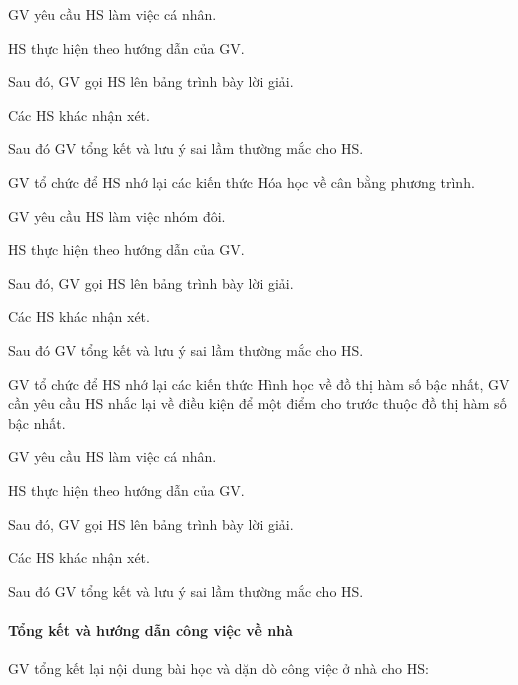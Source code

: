 \tochucthuchien

\begin{tcth}[vidu=1]
	\buocmot
	\item GV yêu cầu HS làm việc cá nhân.
	\buochai
	\item HS thực hiện theo hướng dẫn của GV.
	\buocba
	\item Sau đó, GV gọi HS	lên bảng trình bày lời giải.
	\item Các HS khác nhận xét.
	\buocbon
	\item Sau đó GV tổng kết và lưu ý sai lầm thường mắc cho HS.
\end{tcth}

\begin{tcth}[vidu=2]
	\buocmot
	\item GV tổ chức để HS nhớ lại các kiến thức Hóa học về cân bằng phương trình.
	\item GV yêu cầu HS làm việc nhóm đôi.
	\buochai
	\item HS thực hiện theo hướng dẫn của GV.
	\buocba
	\item Sau đó, GV gọi HS	lên bảng trình bày lời giải.
	\item Các HS khác nhận xét.
	\buocbon
	\item Sau đó GV tổng kết và lưu ý sai lầm thường mắc cho HS.
\end{tcth}

\begin{tcth}[vidu=3]
	\buocmot
	\item GV tổ chức để HS nhớ lại các kiến thức Hình học về đồ thị hàm số bậc nhất, GV cần yêu cầu HS nhắc lại	về điều kiện để một điểm cho trước thuộc đồ thị hàm số bậc nhất.
	\item GV yêu cầu HS làm việc cá nhân.
	\buochai
	\item HS thực hiện theo hướng dẫn của GV.
	\buocba
	\item Sau đó, GV gọi HS	lên bảng trình bày lời giải.
	\item Các HS khác nhận xét.
	\buocbon
	\item Sau đó GV tổng kết và lưu ý sai lầm thường mắc cho HS.
\end{tcth}

\paragraph{Tổng kết và hướng dẫn công việc về nhà}

GV tổng kết lại nội dung bài học và dặn dò công việc ở nhà cho HS:

